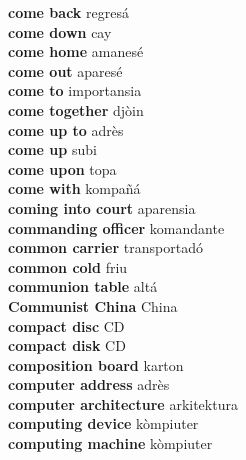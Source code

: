 \textbf{ come back  } regresá \\
\textbf{ come down  } cay \\
\textbf{ come home  } amanesé \\
\textbf{ come out  } aparesé \\
\textbf{ come to  } importansia \\
\textbf{ come together  } djòin \\
\textbf{ come up to  } adrès \\
\textbf{ come up  } subi \\
\textbf{ come upon  } topa \\
\textbf{ come with  } kompañá \\
\textbf{ coming into court  } aparensia \\
\textbf{ commanding officer  } komandante \\
\textbf{ common carrier  } transportadó \\
\textbf{ common cold  } friu \\
\textbf{ communion table  } altá \\
\textbf{ Communist China  } China \\
\textbf{ compact disc  } CD \\
\textbf{ compact disk  } CD \\
\textbf{ composition board  } karton \\
\textbf{ computer address  } adrès \\
\textbf{ computer architecture  } arkitektura \\
\textbf{ computing device  } kòmpiuter \\
\textbf{ computing machine  } kòmpiuter \\
